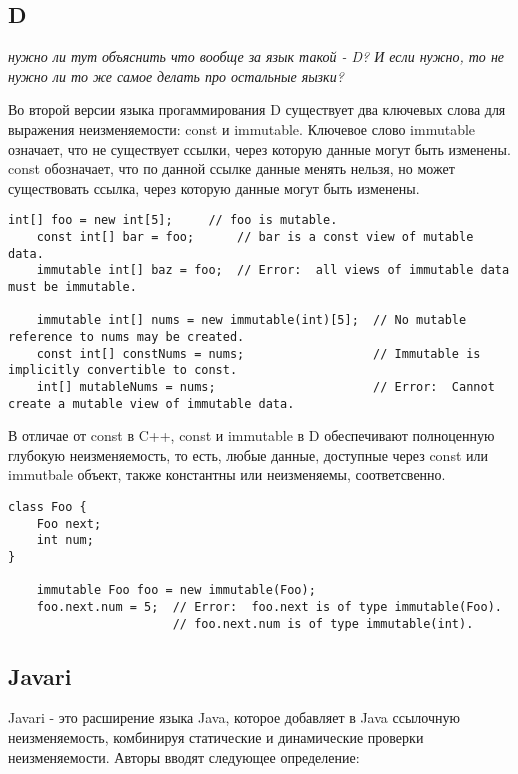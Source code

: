 \subsection{D}

\textit{нужно ли тут объяснить что вообще за язык такой - D? И если нужно, то не нужно ли то же самое делать про остальные яызки?}

Во второй версии языка прогаммирования D существует два ключевых слова для выражения неизменяемости: const и immutable. Ключевое слово immutable означает, что не существует ссылки, через которую данные могут быть изменены. const обозначает, что по данной ссылке данные менять нельзя, но может существовать ссылка, через которую данные могут быть изменены. 

\begin{lstlisting}[caption=const vs immutable, label=code:d_const_vs_immutable]
    int[] foo = new int[5];     // foo is mutable.
    const int[] bar = foo;      // bar is a const view of mutable data.
    immutable int[] baz = foo;  // Error:  all views of immutable data must be immutable.
 
    immutable int[] nums = new immutable(int)[5];  // No mutable reference to nums may be created.
    const int[] constNums = nums;                  // Immutable is implicitly convertible to const.
    int[] mutableNums = nums;                      // Error:  Cannot create a mutable view of immutable data.
\end{lstlisting}

В отличае от const в C++, const и immutable в D обеспечивают полноценную глубокую неизменяемость, то есть, любые данные, доступные через const или immutbale объект, также константны или неизменяемы, соответсвенно.

\begin{lstlisting}[caption=const vs immutable, label=code:d_const_vs_immutable]
class Foo {
    Foo next;
    int num;
}
 
    immutable Foo foo = new immutable(Foo);
    foo.next.num = 5;  // Error:  foo.next is of type immutable(Foo).
                       // foo.next.num is of type immutable(int).
\end{lstlisting}

\subsection{Javari}

Javari - это расширение языка Java, которое добавляет в Java ссылочную неизменяемость, комбинируя статические и динамические проверки неизменяемости. Авторы вводят следующее определение:


